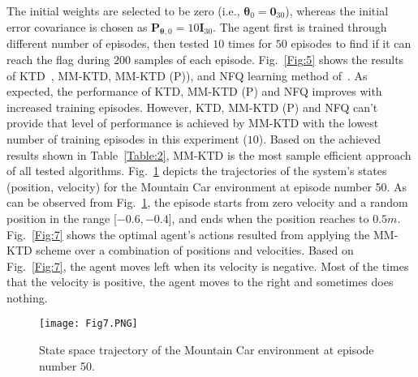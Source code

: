 \documentclass{ieeeaccess}
\def\MMK{\text{MM-KTD}}
\def\bt{\bm{\theta}}
\def\I{\bm{I}}
\def\P{\bm{P}}
\begin{document}
The initial weights are selected to be zero (i.e., $\bt_0 = \bm{0}_{30}$), whereas the initial error covariance is chosen as $\P_{\bt,0} = 10\I_{30}$. The agent first is trained through different number of episodes, then tested $10$ times for $50$ episodes to find if it can reach the flag during $200$ samples of each episode. Fig.~\ref{Fig:5} shows the results of KTD~\cite{23}, $\MMK$, $\MMK$ (P)), and NFQ learning method of~\cite{6}. As expected, the performance of KTD, $\MMK$ (P) and NFQ improves with increased training episodes.  However, KTD, $\MMK$ (P) and NFQ can't provide that level of performance is achieved by $\MMK$ with the lowest number of training episodes in this experiment ($10$). Based on the achieved results shown in Table~\ref{Table:2}, $\MMK$ is the most sample efficient approach of all tested algorithms.
Fig.~\ref{Fig:6} depicts the trajectories of the system's states (position, velocity) for the Mountain Car environment at episode number 50. As can be observed from  Fig.~\ref{Fig:6}, the episode starts from zero velocity and a random position in the range [$-0.6, -0.4$], and ends when the position reaches to $0.5m$. Fig.~\ref{Fig:7} shows the optimal agent's actions resulted from applying the MM-KTD scheme over a combination of positions and velocities. Based on Fig.~\ref{Fig:7}, the agent moves left when its velocity is negative. Most of the times that the velocity is positive, the agent moves to the right and sometimes does nothing. 

%
\begin{figure}[t!]
\centering
\texttt{[image: Fig7.PNG]}
\caption{\small State space trajectory of the Mountain Car environment at episode number 50.}\label{Fig:6}
\end{figure}
\end{document}
